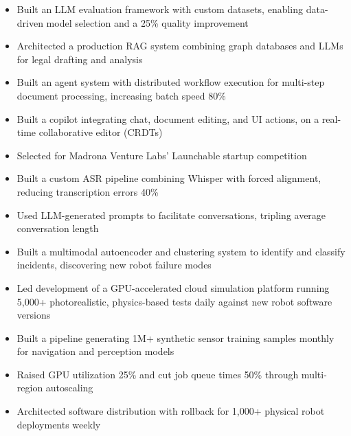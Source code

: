 \documentclass{my_cv}
\begin{document}
\begin{itemize}
\item Built an LLM evaluation framework with custom datasets, enabling data-driven model selection and a 25\% quality improvement
\item Architected a production RAG system combining graph databases and LLMs for legal drafting and analysis
\item Built an agent system with distributed workflow execution for multi-step document processing, increasing batch speed 80\%
\item Built a copilot integrating chat, document editing, and UI actions, on a real-time collaborative editor (CRDTs)
\item Selected for Madrona Venture Labs' Launchable startup competition
\end{itemize}


\begin{itemize}
\item Built a custom ASR pipeline combining Whisper with forced alignment, reducing transcription errors 40\%
\item Used LLM-generated prompts to facilitate conversations, tripling average conversation length
\end{itemize}


\begin{itemize}
\item Built a multimodal autoencoder and clustering system to identify and classify incidents, discovering new robot failure modes
\item Led development of a GPU-accelerated cloud simulation platform running 5,000+ photorealistic, physics-based tests daily against new robot software versions
\item Built a pipeline generating 1M+ synthetic sensor training samples monthly for navigation and perception models
\item Raised GPU utilization 25\% and cut job queue times 50\% through multi-region autoscaling
\item Architected software distribution with rollback for 1,000+ physical robot deployments weekly
\end{itemize}
\end{document}
